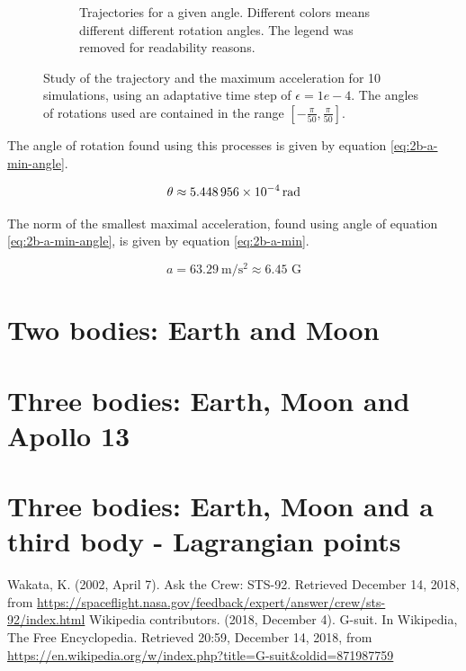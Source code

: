 \documentclass[a4paper,12pt,twoside]{article}
\begin{document}
\begin{figure}[h]
\begin{subfigure}[t]{0.45\textwidth}
    \caption{Trajectories for a given angle. Different colors means different different rotation angles. The legend was removed for readability reasons.}
    \label{fig:2b-min-a-comp}
  \end{subfigure}
  \caption{Study of the trajectory and the maximum acceleration for \num{10} simulations, using an adaptative time step of $\epsilon=1e-4$. The angles of rotations used are contained in the range $[-\frac{\pi}{50}, \frac{\pi}{50}]$.}
  \label{fig:2b-min-a}
\end{figure}

The angle of rotation found using this processes is given by equation \eqref{eq:2b-a-min-angle}.

\begin{equation}
  \theta \approx \SI{5.448956d-4}{\radian} %
  \label{eq:2b-a-min-angle}
\end{equation}

The norm of the smallest maximal acceleration, found using angle of equation \eqref{eq:2b-a-min-angle}, is given by equation \eqref{eq:2b-a-min}.

\begin{equation}
  a = \SI{63.29}{\meter\per\square\second} \approx \num{6.45}\text{ G} %
  \label{eq:2b-a-min}
\end{equation}


\section{Two bodies: Earth and Moon}

\section{Three bodies: Earth, Moon and Apollo 13}

\section{Three bodies: Earth, Moon and a third body - Lagrangian points}


\begin{thebibliography}{99}
   Wakata, K. (2002, April 7). Ask the Crew: STS-92. Retrieved December 14, 2018, from \url{https://spaceflight.nasa.gov/feedback/expert/answer/crew/sts-92/index.html}
   Wikipedia contributors. (2018, December 4). G-suit. In Wikipedia, The Free Encyclopedia. Retrieved 20:59, December 14, 2018, from \url{https://en.wikipedia.org/w/index.php?title=G-suit&oldid=871987759}
\end{thebibliography}
\end{document}
